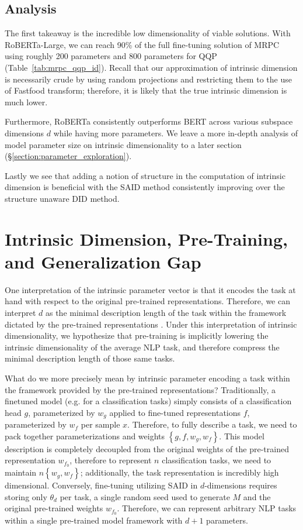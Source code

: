 \documentclass{article} %
\begin{document}
\subsection{Analysis}
The first takeaway is the incredible low dimensionality of viable solutions. With RoBERTa-Large, we can reach 90\% of the full fine-tuning solution of MRPC using roughly 200 parameters and 800 parameters for QQP (Table~\ref{tab:mrpc_qqp_id}). Recall that our approximation of intrinsic dimension is necessarily crude by using random projections and restricting them to the use of Fastfood transform; therefore, it is likely that the true intrinsic dimension is much lower.

Furthermore, RoBERTa consistently outperforms BERT across various subspace dimensions $d$ while having more parameters. We leave a more in-depth analysis of model parameter size on intrinsic dimensionality to a later section (\S\ref{section:parameter_exploration}).

Lastly we see that adding a notion of structure in the computation of intrinsic dimension is beneficial with the SAID method consistently improving over the structure unaware DID method.

\section{Intrinsic Dimension, Pre-Training, and Generalization Gap}
One interpretation of the intrinsic parameter vector is that it encodes the task at hand with respect to the original pre-trained representations. Therefore, we can interpret $d$ as the minimal description length of the task within the framework dictated by the pre-trained representations \citep{min_desc_length}. Under this interpretation of intrinsic dimensionality, we hypothesize that pre-training is implicitly lowering the intrinsic dimensionality of the average NLP task, and therefore compress the minimal description length of those same tasks.

What do we more precisely mean by intrinsic parameter encoding a task within the framework provided by the pre-trained representations? Traditionally, a finetuned model (e.g. for a classification tasks) simply consists of a classification head $g$, parameterized by $w_g$ applied to fine-tuned representations $f$, parameterized by $w_f$ per sample $x$. Therefore, to fully describe a task, we need to pack together parameterizations and weights $\left\{g,f, w_g, w_f\right\}$. This model description is completely decoupled from the original weights of the pre-trained representation $w_{f_0}$, therefore to represent $n$ classification tasks, we need to maintain $n \left\{w_g, w_f\right\}$; additionally, the task representation is incredibly high dimensional. Conversely, fine-tuning utilizing SAID in $d$-dimensions requires storing only $\theta_d$ per task, a single random seed used to generate $M$ and the original pre-trained weights $w_{f_0}$. Therefore, we can represent arbitrary NLP tasks within a single pre-trained model framework with $d+1$ parameters.
\end{document}
